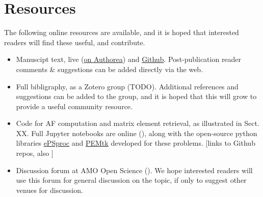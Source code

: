 \section{Resources}\label{sec:resources}

The following online resources are available, and it is hoped that interested readers will find these useful, and contribute.

\begin{itemize}
\item Manuscipt text, live (\href{https://www.authorea.com/users/71114/articles/447808-extracting-molecular-frame-photoionization-dynamics-from-experimental-data}{on Authorea}) and \href{https://github.com/phockett/Extracting-Molecular-Frame-Photoionization-Dynamics-from-Experimental-Data}{Github}. Post-publication reader comments \& suggestions can be added directly via the web.
\item Full bibligraphy, as a Zotero group (TODO). Additional references and suggestions can be added to the group, and it is hoped that this will grow to provide a useful community resource.
\item Code for AF computation and matrix element retrieval, as illustrated in Sect. XX. Full Jupyter notebooks are online (), along with the open-source python libraries \href{https://epsproc.readthedocs.io}{ePSproc} and \href{https://pemtk.readthedocs.io}{PEMtk} developed for these problems. [links to Github repos, also \cite{ePSprocAuthorea,ePSprocFigshare,ePSprocGithub}]
\item Discussion forum at AMO Open Science (). We hope interested readers will use this forum for general discussion on the topic, if only to suggest other venues for discussion.
\end{itemize}